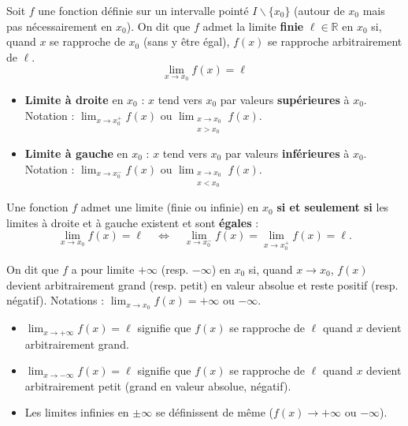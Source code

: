 \documentclass[11pt]{article}
\newcounter{popsec}
\newcounter{popsub}
\newcommand{\courssub}[1]{%
  \stepcounter{popsub}%
  \par\vspace{9pt}\noindent{\popxbold\fontsize{11.5}{13}\selectfont\color{popink}{\color{poporange}\thepopsec.\thepopsub}\hspace{6pt}#1}\par\nopagebreak\vspace{4pt}
}
\def\setminus{\mathbin{\backslash}}\let\smallsetminus\setminus
\begin{document}
\begin{definition}
Soit $f$ une fonction définie sur un intervalle pointé $I\setminus\{x_0\}$ (autour de $x_0$ mais pas nécessairement en $x_0$). On dit que $f$ admet la limite \textbf{finie} $\ell \in \mathbb{R}$ en $x_0$ si, quand $x$ se rapproche de $x_0$ (sans y être égal), $f(x)$ se rapproche arbitrairement de $\ell$.
\[
\lim_{x\to x_0} f(x) = \ell
\]
\end{definition}

\begin{definition}
\begin{itemize}
\item \textbf{Limite à droite} en $x_0$ : $x$ tend vers $x_0$ par valeurs \textbf{supérieures} à $x_0$. Notation : $\displaystyle\lim_{x\to x_0^+} f(x)$ ou $\displaystyle\lim_{\substack{x\to x_0\\x>x_0}} f(x)$.
\item \textbf{Limite à gauche} en $x_0$ : $x$ tend vers $x_0$ par valeurs \textbf{inférieures} à $x_0$. Notation : $\displaystyle\lim_{x\to x_0^-} f(x)$ ou $\displaystyle\lim_{\substack{x\to x_0\\x<x_0}} f(x)$.
\end{itemize}
\end{definition}

\begin{propriete}
Une fonction $f$ admet une limite (finie ou infinie) en $x_0$ \textbf{si et seulement si} les limites à droite et à gauche existent et sont \textbf{égales} :
\[
\lim_{x\to x_0} f(x) = \ell \quad\Longleftrightarrow\quad \lim_{x\to x_0^-} f(x) = \lim_{x\to x_0^+} f(x) = \ell.
\]
\end{propriete}

\begin{definition}
On dit que $f$ a pour limite $+\infty$ (resp. $-\infty$) en $x_0$ si, quand $x\to x_0$, $f(x)$ devient arbitrairement grand (resp. petit) en valeur absolue et reste positif (resp. négatif).
Notations : $\displaystyle\lim_{x\to x_0} f(x) = +\infty$ ou $-\infty$.
\end{definition}

\courssub{Limite en l'infini}

\begin{definition}
\begin{itemize}
\item $\displaystyle\lim_{x\to +\infty} f(x) = \ell$ signifie que $f(x)$ se rapproche de $\ell$ quand $x$ devient arbitrairement grand.
\item $\displaystyle\lim_{x\to -\infty} f(x) = \ell$ signifie que $f(x)$ se rapproche de $\ell$ quand $x$ devient arbitrairement petit (grand en valeur absolue, négatif).
\item Les limites infinies en $\pm\infty$ se définissent de même ($f(x)\to +\infty$ ou $-\infty$).
\end{itemize}
\end{definition}
\end{document}
